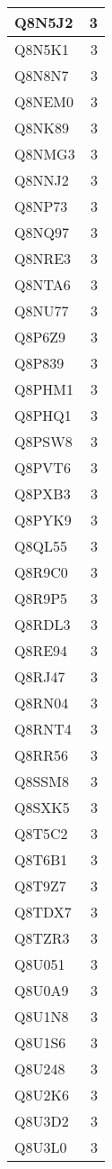 \documentclass[
]{book}
\theoremstyle{definition}
\theoremstyle{definition}
\theoremstyle{definition}
\theoremstyle{definition}
\theoremstyle{remark}
\begin{document}
\begin{table}
\begin{tabular}{l|r}
\hline
Q8N5J2 & 3\\
\hline
Q8N5K1 & 3\\
\hline
Q8N8N7 & 3\\
\hline
Q8NEM0 & 3\\
\hline
Q8NK89 & 3\\
\hline
Q8NMG3 & 3\\
\hline
Q8NNJ2 & 3\\
\hline
Q8NP73 & 3\\
\hline
Q8NQ97 & 3\\
\hline
Q8NRE3 & 3\\
\hline
Q8NTA6 & 3\\
\hline
Q8NU77 & 3\\
\hline
Q8P6Z9 & 3\\
\hline
Q8P839 & 3\\
\hline
Q8PHM1 & 3\\
\hline
Q8PHQ1 & 3\\
\hline
Q8PSW8 & 3\\
\hline
Q8PVT6 & 3\\
\hline
Q8PXB3 & 3\\
\hline
Q8PYK9 & 3\\
\hline
Q8QL55 & 3\\
\hline
Q8R9C0 & 3\\
\hline
Q8R9P5 & 3\\
\hline
Q8RDL3 & 3\\
\hline
Q8RE94 & 3\\
\hline
Q8RJ47 & 3\\
\hline
Q8RN04 & 3\\
\hline
Q8RNT4 & 3\\
\hline
Q8RR56 & 3\\
\hline
Q8SSM8 & 3\\
\hline
Q8SXK5 & 3\\
\hline
Q8T5C2 & 3\\
\hline
Q8T6B1 & 3\\
\hline
Q8T9Z7 & 3\\
\hline
Q8TDX7 & 3\\
\hline
Q8TZR3 & 3\\
\hline
Q8U051 & 3\\
\hline
Q8U0A9 & 3\\
\hline
Q8U1N8 & 3\\
\hline
Q8U1S6 & 3\\
\hline
Q8U248 & 3\\
\hline
Q8U2K6 & 3\\
\hline
Q8U3D2 & 3\\
\hline
Q8U3L0 & 3\\

\end{tabular}
\end{table}
\end{document}
